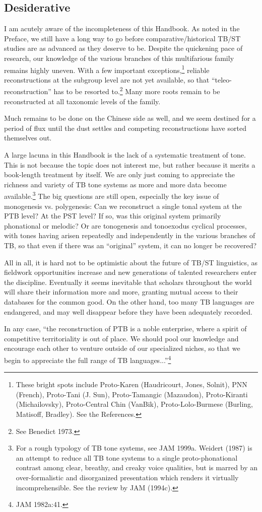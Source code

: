 \documentclass[10pt]{article}
\begin{document}
\subsection{Desiderative}
I am acutely aware of the incompleteness of this Handbook. As noted in the Preface, we still have a long way to go before comparative/historical TB/ST studies are as advanced as they deserve to be. Despite the quickening pace of research, our knowledge of the various branches of this multifarious family remains highly uneven. With a few important exceptions,\footnote{These bright spots include Proto-Karen (Haudricourt, Jones, Solnit), PNN (French), Proto-Tani (J. Sun), Proto-Tamangic (Mazaudon), Proto-Kiranti (Michailovsky), Proto-Central Chin (VanBik), Proto-Lolo-Burmese (Burling, Matisoff, Bradley). See the References.} reliable reconstructions at the subgroup level are not yet available, so that ``teleo-reconstruction'' has to be resorted to.\footnote{See Benedict 1973.} Many more roots remain to be reconstructed at all taxonomic levels of the family.

Much remains to be done on the Chinese side as well, and we seem destined for a period of flux until the dust settles and competing reconstructions have sorted themselves out.

A large lacuna in this Handbook is the lack of a systematic treatment of tone. This is not because the topic does not interest me, but rather because it merits a book-length treatment by itself. We are only just coming to appreciate the richness and variety of TB tone systems as more and more data become available.\footnote{For a rough typology of TB tone systems, see JAM 1999a. Weidert (1987) is an attempt to reduce all TB tone systems to a single proto-phonational contrast among clear, breathy, and creaky voice qualities, but is marred by an over-formalistic and disorganized presentation which renders it virtually incomprehensible. See the review by JAM (1994c).} The big questions are still open, especially the key issue of monogenesis vs. polygenesis: Can we reconstruct a single tonal system at the PTB level? At the PST level? If so, was this original system primarily phonational or melodic? Or are tonogenesis and tonoexodus cyclical processes, with tones having arisen repeatedly and independently in the various branches of TB, so that even if there was an ``original'' system, it can no longer be recovered?

All in all, it is hard not to be optimistic about the future of TB/ST linguistics, as fieldwork opportunities increase and new generations of talented researchers enter the discipline. Eventually it seems inevitable that scholars throughout the world will share their information more and more, granting mutual access to their databases for the common good. On the other hand, too many TB languages are endangered, and may well disappear before they have been adequately recorded.

In any case, ``the reconstruction of PTB is a noble enterprise, where a spirit of competitive territoriality is out of place. We should pool our knowledge and encourage each other to venture outside of our specialized niches, so that we begin to appreciate the full range of TB languages...''\footnote{JAM 1982a:41.}
\end{document}
